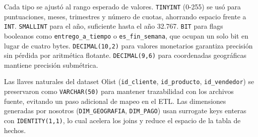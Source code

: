\documentclass[11pt,a4paper]{article}
\begin{document}
Cada tipo se ajustó al rango esperado de valores. \texttt{TINYINT} (0-255) se usó para 
puntuaciones, meses, trimestres y número de cuotas, ahorrando espacio frente a \texttt{INT}. 
\texttt{SMALLINT} para el año, suficiente hasta el año 32.767. \texttt{BIT} para flags 
booleanos como \texttt{entrego\_a\_tiempo} o \texttt{es\_fin\_semana}, que ocupan un solo 
bit en lugar de cuatro bytes. \texttt{DECIMAL(10,2)} para valores monetarios garantiza 
precisión sin pérdida por aritmética flotante. \texttt{DECIMAL(9,6)} para coordenadas 
geográficas mantiene precisión submétrica.

Las llaves naturales del dataset Olist (\texttt{id\_cliente}, \texttt{id\_producto}, 
\texttt{id\_vendedor}) se preservaron como \texttt{VARCHAR(50)} para mantener trazabilidad 
con los archivos fuente, evitando un paso adicional de mapeo en el ETL. Las dimensiones 
generadas por nosotros (\texttt{DIM\_GEOGRAFIA}, \texttt{DIM\_PAGO}) usan surrogate keys 
enteras con \texttt{IDENTITY(1,1)}, lo cual acelera los joins y reduce el espacio de la 
tabla de hechos.
\end{document}
